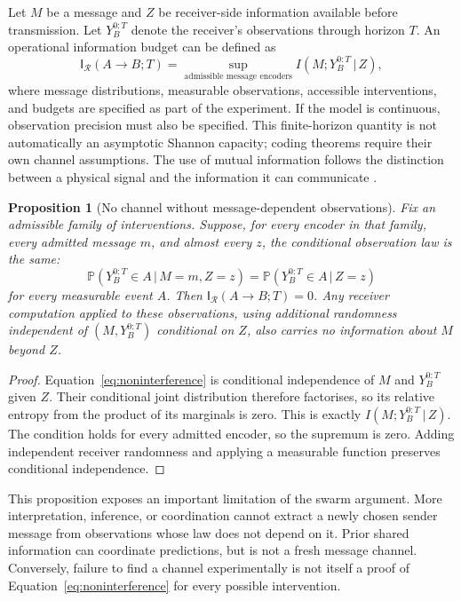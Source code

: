 \documentclass[11pt,a4paper]{article}
\newtheorem{proposition}[theorem]{Proposition}
\theoremstyle{definition}
\theoremstyle{remark}
\newcommand{\Prob}{\mathbb{P}}
\newcommand{\calR}{\mathcal{R}}
\newcommand{\given}{\,\vert\,}
\begin{document}
Let $M$ be a message and $Z$ be receiver-side information available before transmission. Let $Y_B^{0:T}$ denote the receiver's observations through horizon $T$. An operational information budget can be defined as
\begin{equation}\label{eq:infobudget}
 \mathsf I_{\calR}(A\!\to\!B;T)
 =\sup_{\text{admissible message encoders}}
 I(M;Y_B^{0:T}\given Z),
\end{equation}
where message distributions, measurable observations, accessible interventions, and budgets are specified as part of the experiment. If the model is continuous, observation precision must also be specified. This finite-horizon quantity is not automatically an asymptotic Shannon capacity; coding theorems require their own channel assumptions. The use of mutual information follows the distinction between a physical signal and the information it can communicate \citep{shannon}.

\begin{proposition}[No channel without message-dependent observations]\label{prop:noninterference}
Fix an admissible family of interventions. Suppose, for every encoder in that family, every admitted message $m$, and almost every $z$, the conditional observation law is the same:
\begin{equation}\label{eq:noninterference}
 \Prob(Y_B^{0:T}\in A\given M=m,Z=z)
 =\Prob(Y_B^{0:T}\in A\given Z=z)
\end{equation}
for every measurable event $A$. Then $\mathsf I_{\calR}(A\!\to\!B;T)=0$. Any receiver computation applied to these observations, using additional randomness independent of $(M,Y_B^{0:T})$ conditional on $Z$, also carries no information about $M$ beyond $Z$.
\end{proposition}
\begin{proof}
Equation~\eqref{eq:noninterference} is conditional independence of $M$ and $Y_B^{0:T}$ given $Z$. Their conditional joint distribution therefore factorises, so its relative entropy from the product of its marginals is zero. This is exactly $I(M;Y_B^{0:T}\given Z)$. The condition holds for every admitted encoder, so the supremum is zero. Adding independent receiver randomness and applying a measurable function preserves conditional independence.
\end{proof}
This proposition exposes an important limitation of the swarm argument. More interpretation, inference, or coordination cannot extract a newly chosen sender message from observations whose law does not depend on it. Prior shared information can coordinate predictions, but is not a fresh message channel. Conversely, failure to find a channel experimentally is not itself a proof of Equation~\eqref{eq:noninterference} for every possible intervention.
\end{document}
